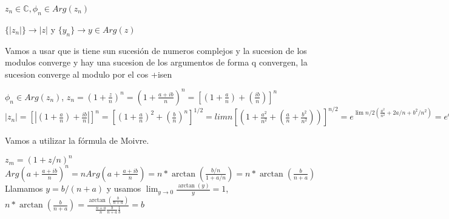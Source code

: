 \begin{sol}



$z_n\in\mathbb{C}, \phi_n\in Arg(z_n)$

$\{ |z_n| \} \rightarrow |z|$ y $\{y_n\} \rightarrow y\in Arg(z)$

Vamos a usar que is tiene sun sucesión de numeros complejos y la sucesion de los modulos converge y hay una sucesion de los argumentos de forma q convergen, la sucesion converge al modulo por el cos +isen

$\phi_n \in Arg(z_n)$, $z_n = (1+\frac{z}{n})^n = (1+\frac{a+ib}{n})^n
= [(1+\frac{a}{n}) + (\frac{ib}{n})] ^n$
$|z_n| = [| (1+\frac{a}{n}) + \frac{ib}{n} |] ^n
= [ (1+\frac{a}{n})^2 + (\frac{b}{n})^n ]^{1/2}
= lim n [ (1+\frac{a^2}{n^2} + (\frac{a}{n}+\frac{b^2}{n^2}) )]^{n/2}
= e^{  \lim n/2 (\frac{a^2}{n^2} + 2a/n + b^2/n^2 )  } = e^a = e^{Re z}$ 

Vamos a utilizar la fórmula de Moivre.

$ z_m = (1+z/n)^n$
$Arg(a+ \frac{a+ib}{n})^n = n Arg(a+\frac{a+ib}{n}) = n*\arctan (\frac{b/n}{1+a/n}) = n*\arctan(\frac{b}{n+a})$
Llamamos $y=b/(n+a)$ y usamos $\lim_{y\rightarrow0} \frac{\arctan(y)}{y} = 1$,
$n*\arctan(\frac{b}{n+a}) = \frac{\arctan(\frac{b}{n+a})}{ \frac{n+a}{n}\frac{b}{n+a}\frac{1}{b} } = b$
\end{sol}